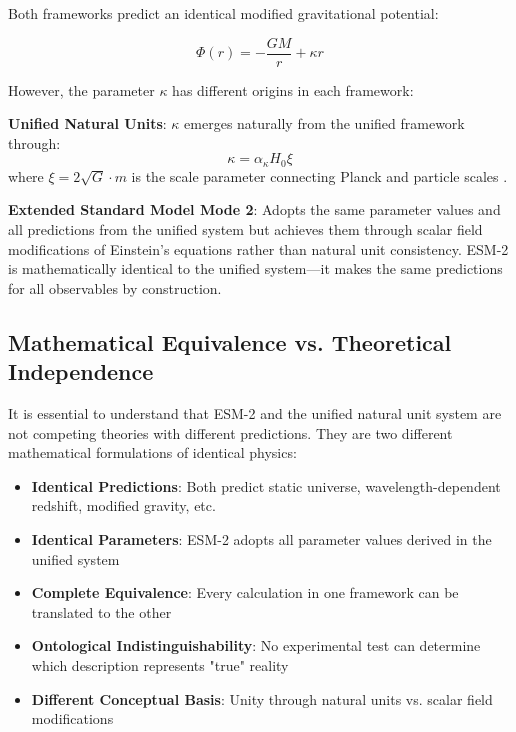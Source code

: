\documentclass[12pt,a4paper]{article}
\newcommand{\xipar}{\xi}
\begin{document}
	Both frameworks predict an identical modified gravitational potential:
	
	\begin{equation}
		\Phi(r) = -\frac{GM}{r} + \kappa r
	\end{equation}
	
	However, the parameter $\kappa$ has different origins in each framework:
	
	\textbf{Unified Natural Units}: $\kappa$ emerges naturally from the unified framework through:
	\begin{equation}
		\kappa = \alpha_\kappa H_0 \xipar
	\end{equation}
	where $\xipar = 2\sqrt{G} \cdot m$ is the scale parameter connecting Planck and particle scales \cite{pascher_beta_derivation_2025}.
	
	\textbf{Extended Standard Model Mode 2}: Adopts the same parameter values and all predictions from the unified system but achieves them through scalar field modifications of Einstein's equations rather than natural unit consistency. ESM-2 is mathematically identical to the unified system—it makes the same predictions for all observables by construction.
	
	\subsection{Mathematical Equivalence vs. Theoretical Independence}
	\label{subsec:equivalence_vs_independence}
	
	It is essential to understand that ESM-2 and the unified natural unit system are not competing theories with different predictions. They are two different mathematical formulations of identical physics:
	
	\begin{itemize}
		\item \textbf{Identical Predictions}: Both predict static universe, wavelength-dependent redshift, modified gravity, etc.
		\item \textbf{Identical Parameters}: ESM-2 adopts all parameter values derived in the unified system
		\item \textbf{Complete Equivalence}: Every calculation in one framework can be translated to the other
		\item \textbf{Ontological Indistinguishability}: No experimental test can determine which description represents "true" reality \cite{vanFraassen1980}
		\item \textbf{Different Conceptual Basis}: Unity through natural units vs. scalar field modifications
	\end{itemize}
	
\end{document}

